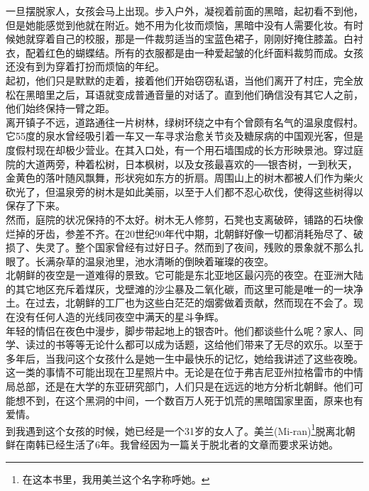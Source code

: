 一旦摆脱家人，女孩会马上出现。步入户外，凝视着前面的黑暗，起初看不到他，但是她能感觉到他就在附近。她不用为化妆而烦恼，黑暗中没有人需要化妆。有时候她就穿着自己的校服，那是一件裁剪适当的宝蓝色裙子，刚刚好掩住膝盖。白衬衣，配着红色的蝴蝶结。所有的衣服都是由一种爱起皱的化纤面料裁剪而成。女孩还没有到为穿着打扮而烦恼的年纪。\\

起初，他们只是默默的走着，接着他们开始窃窃私语，当他们离开了村庄，完全放松在黑暗里之后，耳语就变成普通音量的对话了。直到他们确信没有其它人之前，他们始终保持一臂之距。\\

离开镇子不远，道路通往一片树林，绿树环绕之中有个曾颇有名气的温泉度假村。它55度的泉水曾经吸引着一车又一车寻求治愈关节炎及糖尿病的中国观光客，但是度假村现在却极少营业。在其入口处，有一个用石墙围成的长方形映景池。穿过庭院的大道两旁，种着松树，日本枫树，以及女孩最喜欢的──银杏树，一到秋天，金黄色的落叶随风飘舞，形状宛如东方的折扇。周围山上的树木都被人们作为柴火砍光了，但温泉旁的树木是如此美丽，以至于人们都不忍心砍伐，使得这些树得以保存了下来。\\

然而，庭院的状况保持的不太好。树木无人修剪，石凳也支离破碎，铺路的石块像烂掉的牙齿，参差不齐。在20世纪90年代中期，北朝鲜好像一切都消耗殆尽了、破损了、失灵了。整个国家曾经有过好日子。然而到了夜间，残败的景象就不那么扎眼了。长满杂草的温泉池里，池水清晰的倒映着璀璨的夜空。\\

北朝鲜的夜空是一道难得的景致。它可能是东北亚地区最闪亮的夜空。在亚洲大陆的其它地区充斥着煤灰，戈壁滩的沙尘暴及二氧化碳，而这里可能是唯一的一块净土。在过去，北朝鲜的工厂也为这些白茫茫的烟雾做着贡献，然而现在不会了。现在没有任何人造的光线同夜空中满天的星斗争辉。\\

年轻的情侣在夜色中漫步，脚步带起地上的银杏叶。他们都谈些什么呢？家人、同学、读过的书等等无论什么都可以成为话题，这给他们带来了无尽的欢乐。以至于多年后，当我问这个女孩什么是她一生中最快乐的记忆，她给我讲述了这些夜晚。\\

这一类的事情不可能出现在卫星照片中。无论是在位于弗吉尼亚州拉格雷市的中情局总部，还是在大学的东亚研究部门，人们只是在远远的地方分析北朝鲜。他们可能想不到，在这个黑洞的中间，一个数百万人死于饥荒的黑暗国家里面，原来也有爱情。\\

到我遇到这个女孩的时候，她已经是一个31岁的女人了。美兰(Mi-ran)\footnote{在这本书里，我用美兰这个名字称呼她。}脱离北朝鲜在南韩已经生活了6年。我曾经因为一篇关于脱北者的文章而要求采访她。\\

